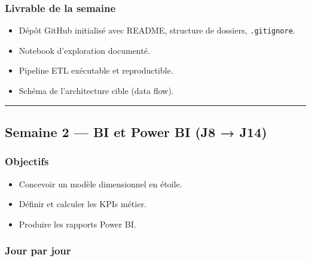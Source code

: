 \documentclass[11pt,a4paper]{article}
\providecommand{\tightlist}{\setlength{\itemsep}{0pt}\setlength{\parskip}{0pt}}
\begin{document}
\subsubsection{Livrable de la semaine}\label{livrable-de-la-semaine}

\begin{itemize}
\tightlist
\item
  Dépôt GitHub initialisé avec README, structure de dossiers,
  \texttt{.gitignore}.
\item
  Notebook d'exploration documenté.
\item
  Pipeline ETL exécutable et reproductible.
\item
  Schéma de l'architecture cible (data flow).
\end{itemize}

\begin{center}\rule{0.5\linewidth}{0.5pt}\end{center}

\subsection{Semaine 2 --- BI et Power BI (J8 →
J14)}\label{semaine-2-bi-et-power-bi-j8-j14}

\subsubsection{Objectifs}\label{objectifs-1}

\begin{itemize}
\tightlist
\item
  Concevoir un modèle dimensionnel en étoile.
\item
  Définir et calculer les KPIs métier.
\item
  Produire les rapports Power BI.
\end{itemize}

\subsubsection{Jour par jour}\label{jour-par-jour-1}
\end{document}
